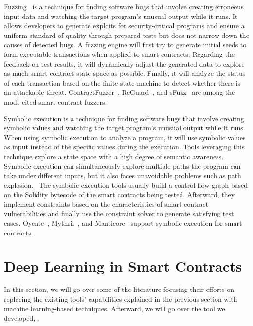 Fuzzing~\cite{chen2018systematic} is a technique for finding software bugs that involve creating erroneous input data and watching the target program's unusual output while it runs.
It allows developers to generate exploits for security-critical programs and ensure a uniform standard of quality through prepared tests but does not narrow down the causes of detected bugs.
A fuzzing engine will first try to generate initial seeds to form executable transactions when applied to smart contracts. Regarding the feedback on test results,
it will dynamically adjust the generated data to explore as much smart contract state space as possible.
Finally, it will analyze the status of each transaction based on the finite state machine to detect whether there is an attackable threat.
ContractFuzzer~\cite{contractfuzzer}, ReGuard~\cite{liu2018reguard}, and sFuzz~\cite{nguyen2020sfuzz} are among the modt cited smart contract fuzzers.

Symbolic execution is a technique for finding software bugs that involve creating symbolic values and watching the target program's unusual output while it runs.
When using symbolic execution to analyze a program, it will use symbolic values as input instead of the specific values during the execution.
Tools leveraging this technique explore a state space with a high degree of semantic awareness.~\cite{boyer1975select}
Symbolic execution can simultaneously explore multiple paths the program can take under different inputs, but it also faces unavoidable problems such as path explosion.~\cite{Empirical-Evaluation-of-Smart-Contract-Testing:What-is-the-Best-Choice}
The symbolic execution tools usually build a control flow graph based on the Solidity bytecode of the smart contracts being tested.
Afterward, they implement constraints based on the characteristics of smart contract vulnerabilities and finally use the constraint solver to generate satisfying test cases.
Oyente~\cite{oyente}, Mythril~\cite{mythril}, and Manticore~\cite{mossberg2019manticore} support symbolic execution for smart contracts.


\section{Deep Learning in Smart Contracts} \label{sec:dl-models}

In this section, we will go over some of the literature focusing their efforts on replacing the existing tools' capabilities explained in the previous section with machine learning-based techniques.
Afterward, we will go over the tool we developed, \slithersimil.


